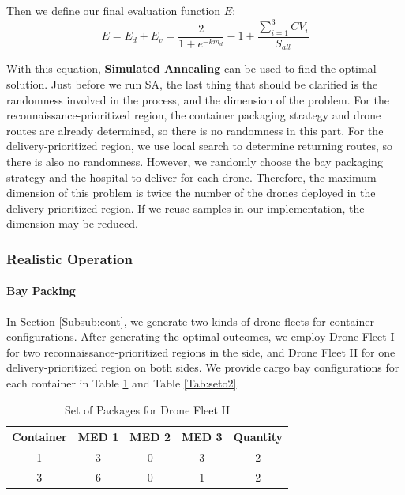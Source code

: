\documentclass{mcmthesis}
\begin{document}
Then we define our final evaluation function $E$:
\begin{equation}
    E = E_d + E_v = \frac{2}{1+e^{-km_d}} - 1 + \frac{\sum_{i=1}^3 CV_i}{S_{all}}
\end{equation}

With this equation, \textbf{Simulated Annealing} can be used to find the optimal solution. Just before we run SA, the last thing that should be clarified is the randomness involved in the process, and the dimension of the problem. For the reconnaissance-prioritized region, the container packaging strategy and drone routes are already determined, so there is no randomness in this part. For the delivery-prioritized region, we use local search to determine returning routes, so there is also no randomness. However, we randomly choose the bay packaging strategy and the hospital to deliver for each drone. Therefore, the maximum dimension of this problem is twice the number of the drones deployed in the delivery-prioritized region. If we reuse samples in our implementation, the dimension may be reduced.




\subsubsection{Realistic Operation}\label{Subsub:real}

\paragraph{Bay Packing}In Section \ref{Subsub:cont}, we generate two kinds of drone fleets for container configurations. After generating the optimal outcomes, we employ Drone Fleet I for two reconnaissance-prioritized regions in the side, and Drone Fleet II for one delivery-prioritized region on both sides. We provide cargo bay configurations for each container in Table \ref{Tab:seto1} and Table \ref{Tab:seto2}.

\begin{table}[htbp]
  \centering
  \caption{Set of Packages for Drone Fleet II}
    \begin{tabular}{ccccc}
    \hline
    Container & MED 1 & MED 2 & MED 3 & Quantity \\
    \hline
    1     & 3     & 0     & 3     & 2 \\
    3     & 6     & 0     & 1     & 2 \\
    \hline
    \end{tabular}%
  \label{Tab:seto1}%
\end{table}%
\end{document}
